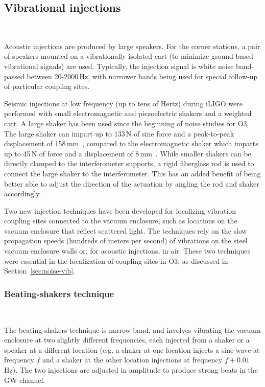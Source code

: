 \subsection{Vibrational injections}~\label{sec:injections-vib}

Acoustic injections are produced by large speakers.
For the corner stations, a pair of speakers mounted on a vibrationally isolated cart (to minimize ground-based vibrational signals) are used.
Typically, the injection signal is white noise band-passed between 20-2000\,Hz, with narrower bands being used for special follow-up of particular coupling sites.

Seismic injections at low frequency (up to tens of Hertz) during \ac{iLIGO} were performed with small electromagnetic and piezoelectric shakers and a weighted cart.
A large shaker has been used since the beginning of noise studies for \ac{O3}.
The large shaker can impart up to 133\,N of sine force and a peak-to-peak displacement of 158\,mm~\citep{big_shaker}, compared to the electromagnetic shaker which imparts up to 45\,N of force and a displacement of 8\,mm~\citep{bk}.
While smaller shakers can be directly clamped to the interferometer supports, a rigid fiberglass rod is used to connect the large shaker to the interferometer.
This has an added benefit of being better able to adjust the direction of the actuation by angling the rod and shaker accordingly.

Two new injection techniques have been developed for localizing vibration coupling sites connected to the vacuum enclosure, such as locations on the vacuum enclosure that reflect scattered light.
The techniques rely on the slow propagation speeds (hundreds of meters per second) of vibrations on the steel vacuum enclosure walls or, for acoustic injections, in air.
These two techniques were essential in the localization of coupling sites in \ac{O3}, as discussed in Section~\ref{sec:noise-vib}.

\subsubsection{Beating-shakers technique}~\label{sec:injections-vib-beats}

The beating-shakers technique is narrow-band, and involves vibrating the vacuum enclosure at two slightly different frequencies, each injected from a shaker or a speaker at a different location (e.g. a shaker at one location injects a sine wave at frequency $f$ and a shaker at the other location injections at frequency $f + 0.01$\,Hz).
The two injections are adjusted in amplitude to produce strong beats in the \ac{GW} channel.


